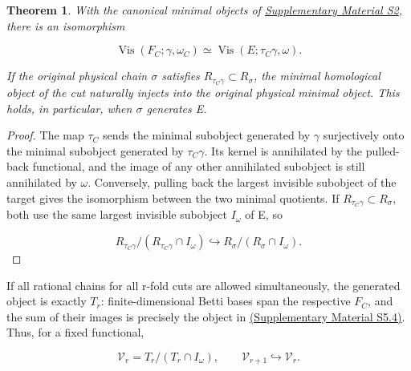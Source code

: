 \documentclass[11pt,a4paper,oneside]{article}
\theoremstyle{plain}
\newtheorem{theorem}{Theorem}[section]
\theoremstyle{definition}
\theoremstyle{remark}
\numberwithin{equation}{section}
\newcommand{\otherref}[2]{\href{#1.pdf}{#2}}
\begin{document}
\begin{theorem}

\label{thm:cut:4.1} With the canonical minimal objects of \otherref{feynman_periods_supplement_en}{Supplementary Material S2}, there is an isomorphism

\begin{equation}
\operatorname{Vis}(F_C;\gamma,\omega_C)
     \simeq\operatorname{Vis}(E;\tau_C\gamma,\omega).  \label{eq:cut:4.2}
\end{equation}

If the original physical chain \(\sigma \) satisfies \(R_{\tau _C\gamma }\subset R_\sigma \), the minimal homological object of the cut naturally injects into the original physical minimal object. This holds, in particular, when \(\sigma \) generates E.

\end{theorem}

\begin{proof}

The map \(\tau _C\) sends the minimal subobject generated by \(\gamma \) surjectively onto the minimal subobject generated by \(\tau _C\gamma \). Its kernel is annihilated by the pulled-back functional, and the image of any other annihilated subobject is still annihilated by \(\omega \). Conversely, pulling back the largest invisible subobject of the target gives the isomorphism between the two minimal quotients. If \(R_{\tau _C\gamma }\subset R_\sigma \), both use the same largest invisible subobject \(I_\omega \) of E, so

\begin{equation}
R_{\tau _C\gamma }/(R_{\tau _C\gamma }\cap I_\omega)
       \hookrightarrow R_\sigma/(R_\sigma\cap I_\omega).
\end{equation}

\end{proof}

If all rational chains for all r-fold cuts are allowed simultaneously, the generated object is exactly \(T_r\): finite-dimensional Betti bases span the respective \(F_C\), and the sum of their images is precisely the object in \otherref{feynman_periods_supplement_en}{(Supplementary Material S5.4)}. Thus, for a fixed functional,

\begin{equation}
\mathcal V_r=T_r/(T_r\cap I_\omega),\qquad
 \mathcal V_{r+1}\hookrightarrow\mathcal V_r.          \label{eq:cut:4.3}
\end{equation}
\end{document}
